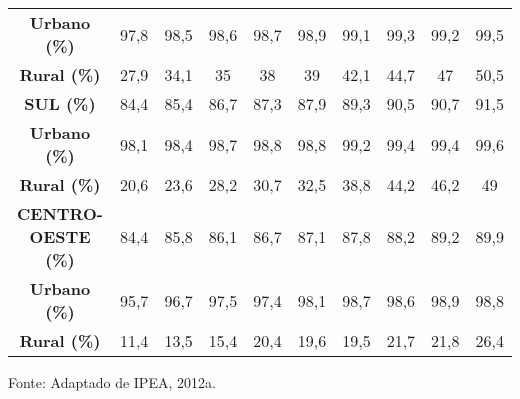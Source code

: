 \begin{table}[phtb!]
\begin{tabular}{cccccccccc}
			\textbf{Urbano (\%)}       & 97,8          & 98,5          & 98,6          & 98,7          & 98,9          & 99,1          & 99,3          & 99,2          & 99,5          \\
			\textbf{Rural (\%)}        & 27,9          & 34,1          & 35            & 38            & 39            & 42,1          & 44,7          & 47            & 50,5          \\
			\textbf{SUL (\%)}          & 84,4          & 85,4          & 86,7          & 87,3          & 87,9          & 89,3          & 90,5          & 90,7          & 91,5          \\
			\textbf{Urbano (\%)}       & 98,1          & 98,4          & 98,7          & 98,8          & 98,8          & 99,2          & 99,4          & 99,4          & 99,6          \\
			\textbf{Rural (\%)}        & 20,6          & 23,6          & 28,2          & 30,7          & 32,5          & 38,8          & 44,2          & 46,2          & 49            \\
			\textbf{CENTRO-OESTE (\%)} & 84,4          & 85,8          & 86,1          & 86,7          & 87,1          & 87,8          & 88,2          & 89,2          & 89,9          \\
			\textbf{Urbano (\%)}       & 95,7          & 96,7          & 97,5          & 97,4          & 98,1          & 98,7          & 98,6          & 98,9          & 98,8          \\
			\textbf{Rural (\%)}        & 11,4          & 13,5          & 15,4          & 20,4          & 19,6          & 19,5          & 21,7          & 21,8          & 26,4         
		\end{tabular}
	Fonte: Adaptado de IPEA, 2012a.
	\end{table}